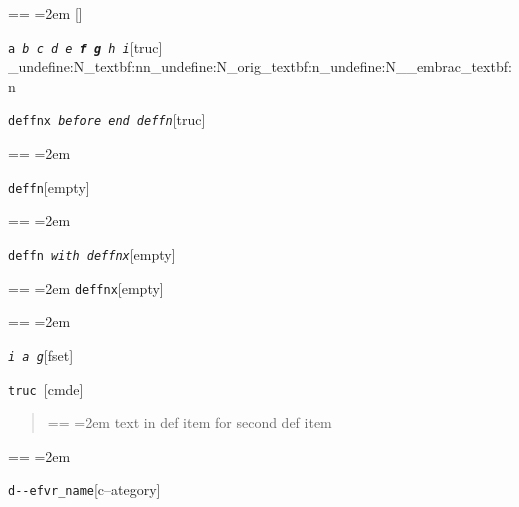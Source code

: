 \documentclass{book}
\makeatletter
\newcommand\GNUTexinfocommandstyletextvar[1]{{\normalfont{}\textsl{#1}}}%
\newenvironment{GNUTexinfopreformatted}{%
  \par\obeylines\obeyspaces\frenchspacing
  \parskip=\z@\parindent=\z@}{}
\makeatother
\begin{document}
%
\begin{GNUTexinfopreformatted}
\leftskip=2em\relax\ttfamily%
\end{GNUTexinfopreformatted}
\noindent\texttt{}\hfill[]

\noindent\texttt{a \EmbracOn{}\textnormal{\textsl{b c d e \textbf{f g} h i}}\EmbracOff{}}\hfill[truc]
\ExplSyntaxOn%
\cs_undefine:N{\embrac_textbf:nn}\cs_undefine:N{\embrac_orig_textbf:n}\cs_undefine:N{\__embrac_textbf:n}%
\ExplSyntaxOff%

%
\noindent\texttt{deffnx \EmbracOn{}\textnormal{\textsl{before end deffn}}\EmbracOff{}}\hfill[truc]

%
\begin{GNUTexinfopreformatted}
\leftskip=2em\relax\ttfamily%


\end{GNUTexinfopreformatted}
\noindent\texttt{deffn}\hfill[empty]

%
\begin{GNUTexinfopreformatted}
\leftskip=2em\relax\ttfamily%

\end{GNUTexinfopreformatted}
\noindent\texttt{deffn \EmbracOn{}\textnormal{\textsl{with deffnx}}\EmbracOff{}}\hfill[empty]

%
\begin{GNUTexinfopreformatted}
\leftskip=2em\relax\ttfamily%
\end{GNUTexinfopreformatted}
\noindent\texttt{deffnx}\hfill[empty]

%
\begin{GNUTexinfopreformatted}
\leftskip=2em\relax\ttfamily%

\end{GNUTexinfopreformatted}
\noindent\texttt{\GNUTexinfocommandstyletextvar{i} \EmbracOn{}\textnormal{\textsl{a g}}\EmbracOff{}}\hfill[fset]

\index[fn]{i@\texttt{\GNUTexinfocommandstyletextvar{i}}}%
\noindent\texttt{truc \EmbracOn{}\textnormal{\textsl{}}\EmbracOff{}}\hfill[cmde]

%
\begin{quote}
\unskip{\parskip=0pt\noindent}%
\begin{GNUTexinfopreformatted}
\leftskip=2em\relax\ttfamily%
text in def item for second def item
\end{GNUTexinfopreformatted}
\end{quote}
\begin{GNUTexinfopreformatted}
\leftskip=2em\relax\ttfamily%


\end{GNUTexinfopreformatted}
\noindent\texttt{d{-}{-}efvr\_name}\hfill[c--ategory]
\end{document}
